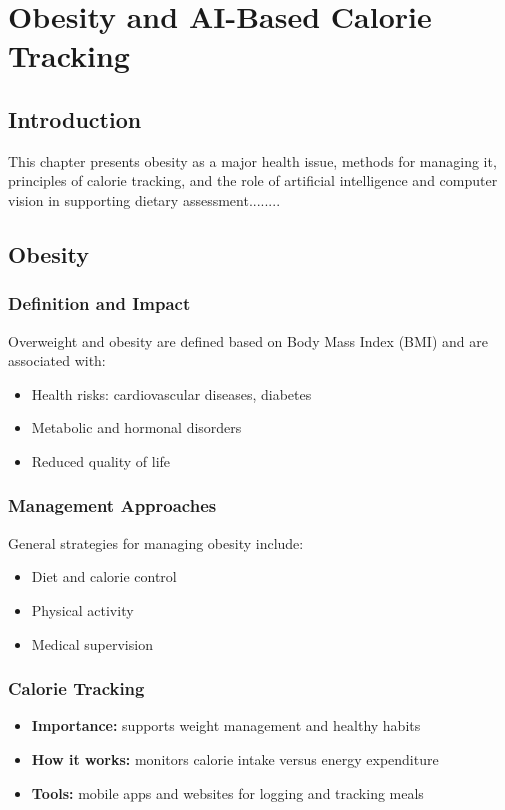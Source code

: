 \chapter{Obesity and AI-Based Calorie Tracking}
\label{chap:obesity_calorie}

\section*{Introduction}
This chapter presents obesity as a major health issue, methods for managing it, principles of calorie tracking, and the role of artificial intelligence and computer vision in supporting dietary assessment........

\section{Obesity}

\subsection{Definition and Impact}
Overweight and obesity are defined based on Body Mass Index (BMI) and are associated with:
\begin{itemize}
    \item Health risks: cardiovascular diseases, diabetes
    \item Metabolic and hormonal disorders
    \item Reduced quality of life
\end{itemize}

\subsection{Management Approaches}
General strategies for managing obesity include:
\begin{itemize}
    \item Diet and calorie control
    \item Physical activity
    \item Medical supervision
\end{itemize}

\subsection{Calorie Tracking}
\begin{itemize}
    \item \textbf{Importance:} supports weight management and healthy habits
    \item \textbf{How it works:} monitors calorie intake versus energy expenditure
    \item \textbf{Tools:} mobile apps and websites for logging and tracking meals
\end{itemize}


